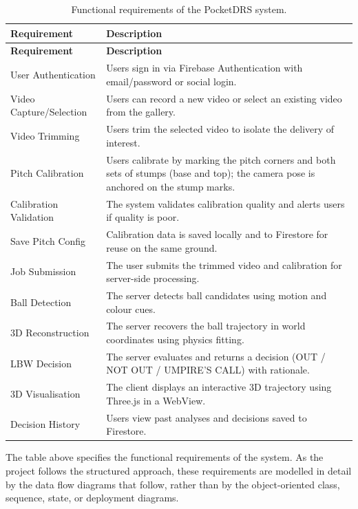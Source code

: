 \documentclass[12pt,a4paper]{report}
\begin{document}
\begin{longtable}{|p{4.5cm}|p{9.3cm}|}
\caption{Functional requirements of the PocketDRS system.}\\
\hline
\textbf{Requirement} & \textbf{Description} \\
\hline
\endfirsthead
\hline
\textbf{Requirement} & \textbf{Description} \\
\hline
\endhead
User Authentication & Users sign in via Firebase Authentication with email/password or social login. \\
\hline
Video Capture/Selection & Users can record a new video or select an existing video from the gallery. \\
\hline
Video Trimming & Users trim the selected video to isolate the delivery of interest. \\
\hline
Pitch Calibration & Users calibrate by marking the pitch corners and both sets of stumps (base and top); the camera pose is anchored on the stump marks. \\
\hline
Calibration Validation & The system validates calibration quality and alerts users if quality is poor. \\
\hline
Save Pitch Config & Calibration data is saved locally and to Firestore for reuse on the same ground. \\
\hline
Job Submission & The user submits the trimmed video and calibration for server-side processing. \\
\hline
Ball Detection & The server detects ball candidates using motion and colour cues. \\
\hline
3D Reconstruction & The server recovers the ball trajectory in world coordinates using physics fitting. \\
\hline
LBW Decision & The server evaluates and returns a decision (OUT / NOT OUT / UMPIRE'S CALL) with rationale. \\
\hline
3D Visualisation & The client displays an interactive 3D trajectory using Three.js in a WebView. \\
\hline
Decision History & Users view past analyses and decisions saved to Firestore. \\
\hline
\end{longtable}

The table above specifies the functional requirements of the system. As the project follows the structured approach, these requirements are modelled in detail by the data flow diagrams that follow, rather than by the object-oriented class, sequence, state, or deployment diagrams.
\end{document}
